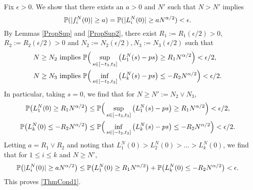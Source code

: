 	Fix $\epsilon>0$. We show that there exists an $a>0$ and $N'$ such that $N>N'$ implies
	$$\mathbb{P}(|f^N_i(0)|\geq a) = \mathbb{P}(|L_i^N(0)|\geq a N^{\alpha/2})<\epsilon.$$
	By Lemmas \ref{PropSup} and \ref{PropSup2}, there exist $R_1 := R_1(\epsilon/2)>0$, $R_2 := R_2(\epsilon/2)>0$ and $N_2 := N_2(\epsilon/2),N_3 := N_3(\epsilon/2)$ such that 
	\begin{align*}
	N\geq N_2 &\text{ implies } \mathbb{P}\Big(\sup_{s\in[-t_3,t_3]}\left(L_1^N(s)-ps\right)\geq R_1N^{\alpha/2}\Big)<\epsilon/2,\\
	N\geq N_3 &\text{ implies } \mathbb{P}\Big(\inf_{s\in[-t_2,t_2]}\left(L_k^N(s)-ps\right)\leq -R_2 N^{\alpha/2}\Big)<\epsilon/2.
	\end{align*}
	In particular, taking $s=0$, we find that for $N\geq N' := N_2 \vee N_3$, 
	\begin{align*}
	\mathbb{P}\big(L_1^N(0)\geq R_1N^{\alpha/2}\big) &\leq \mathbb{P}\Big(\sup_{s\in[-t_3,t_3]}\left(L_1^N(s)-ps\right)\geq R_1N^{\alpha/2}\Big)< \epsilon/2,\\
	\mathbb{P}\big(L_k^N(0)\leq -R_2N^{\alpha/2}\big) &\leq \mathbb{P}\Big(\inf_{s\in[-t_2,t_2]}\left(L_k^N(s)-ps\right)\leq -R_2N^{\alpha/2}\Big)< \epsilon/2.
	\end{align*}
	Letting $a = R_1 \vee R_2$ and noting that $L_1^N(0)>L_2^N(0)>...>L_k^N(0)$, we find that for $1\leq i\leq k$ and $N \geq N'$,
	$$\mathbb{P}\big(|L_i^N(0)|\geq a N^{\alpha/2}\big)\leq \mathbb{P}\big(L_1^N(0)\geq R_1 N^{\alpha/2}\big) + \mathbb{P}\big(L_k^N(0)\leq -R_2N^{\alpha/2}\big) < \epsilon.$$
	This proves \eqref{ThmCond1}.\\
	
